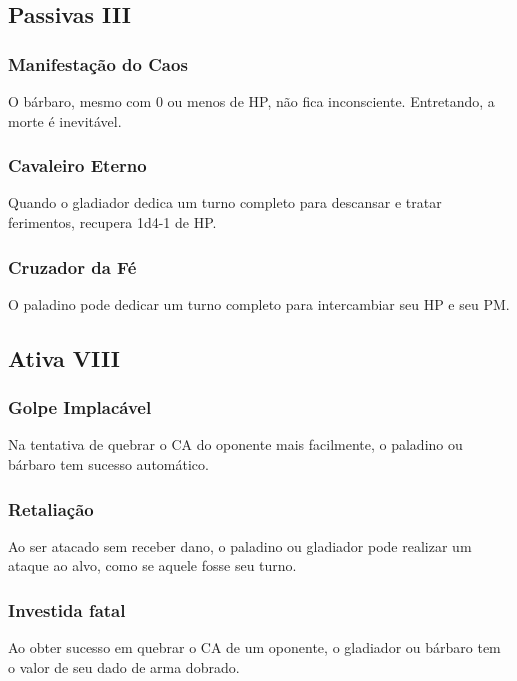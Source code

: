 \documentclass[10pt,twoside,twocolumn]{book}
\begin{document}

\subsection*{Passivas III}
\subsubsection*{Manifestação do Caos}
O bárbaro, mesmo com 0 ou menos de HP, não fica inconsciente. Entretando, a morte é inevitável.
\subsubsection*{Cavaleiro Eterno}
Quando o gladiador dedica um turno completo para descansar e tratar ferimentos, recupera 1d4-1 de HP.
\subsubsection*{Cruzador da Fé}
O paladino pode dedicar um turno completo para intercambiar seu HP e seu PM.

\subsection*{Ativa VIII}
\subsubsection*{Golpe Implacável}
Na tentativa de quebrar o CA do oponente mais facilmente, o paladino ou bárbaro tem sucesso automático.
\subsubsection*{Retaliação}
Ao ser atacado sem receber dano, o paladino ou gladiador pode realizar um ataque ao alvo, como se aquele fosse seu turno.
\subsubsection*{Investida fatal}
Ao obter sucesso em quebrar o CA de um oponente, o gladiador ou bárbaro tem o valor de seu dado de arma dobrado.
\end{document}
